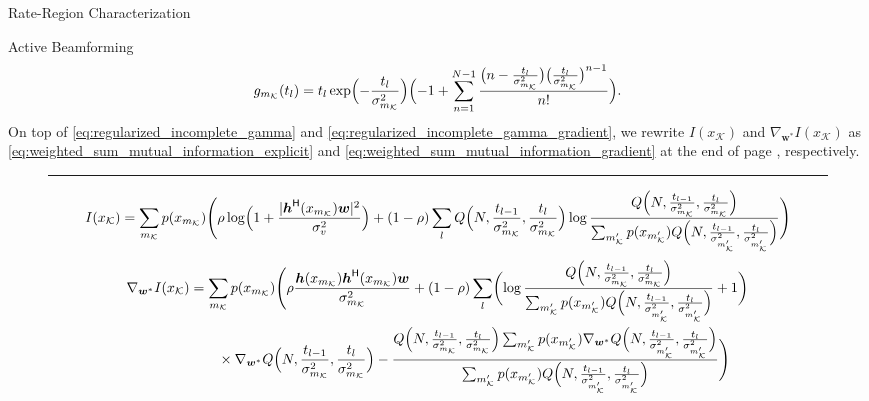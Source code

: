 \documentclass[journal]{IEEEtran}
\begin{document}
\begin{section}{Rate-Region Characterization}
\begin{subsection}{Active Beamforming}
\begin{equation}
			g_{m_{\mathcal{K}}}(t_l) = t_l\exp\Bigl(-\frac{t_l}{\sigma_{m_{\mathcal{K}}}^2}\Bigr)\Bigl(-1+\sum_{n=1}^{N-1} \frac{\bigl(n - \frac{t_l}{\sigma_{m_{\mathcal{K}}}^2}\bigr) \bigl(\frac{t_l}{\sigma_{m_{\mathcal{K}}}^2}\bigr)^{n-1}}{n!}\Bigr).
			\label{eq:regularized_incomplete_gamma_gradient_component}
		\end{equation}
		On top of \eqref{eq:regularized_incomplete_gamma} and \eqref{eq:regularized_incomplete_gamma_gradient}, we rewrite $I(x_{\mathcal{K}})$ and $\nabla_{\boldsymbol{w}^*} I(x_{\mathcal{K}})$ as \eqref{eq:weighted_sum_mutual_information_explicit} and \eqref{eq:weighted_sum_mutual_information_gradient} at the end of page \pageref{eq:weighted_sum_mutual_information_explicit}, respectively.
		\begin{figure*}[!b]
			\hrule
			\begin{equation}
				I(x_{\mathcal{K}})=\sum_{m_{\mathcal{K}}}p(x_{m_{\mathcal{K}}})\Biggl(\rho\log\Bigl(1+\frac{\lvert\boldsymbol{h}^\mathsf{H}(x_{m_{\mathcal{K}}})\boldsymbol{w}\rvert^2}{\sigma_v^2}\Bigr)+(1-\rho)\sum_l Q\Bigl(N,\frac{t_{l-1}}{\sigma_{m_{\mathcal{K}}}^2},\frac{t_l}{\sigma_{m_{\mathcal{K}}}^2}\Bigr) \log \frac{Q\Bigl(N,\frac{t_{l-1}}{\sigma_{m_{\mathcal{K}}}^2},\frac{t_l}{\sigma_{m_{\mathcal{K}}}^2}\Bigr)}{\sum_{m_{\mathcal{K}}'} p(x_{m_{\mathcal{K}}'}) Q\Bigl(N,\frac{t_{l-1}}{\sigma_{m_{\mathcal{K}}'}^2},\frac{t_l}{\sigma_{m_{\mathcal{K}}'}^2}\Bigr)}\Biggr)
				\label{eq:weighted_sum_mutual_information_explicit}
			\end{equation}
			\begin{align}
				\nabla_{\boldsymbol{w}^*} I(x_{\mathcal{K}})
				 & = \sum_{m_{\mathcal{K}}}p(x_{m_{\mathcal{K}}})\Biggl(\rho\frac{\boldsymbol{h}(x_{m_{\mathcal{K}}})\boldsymbol{h}^\mathsf{H}(x_{m_{\mathcal{K}}})\boldsymbol{w}}{\sigma_{m_{\mathcal{K}}}^2}+(1-\rho)\sum_l\biggl(\log\frac{Q\Bigl(N,\frac{t_{l-1}}{\sigma_{m_{\mathcal{K}}}^2},\frac{t_l}{\sigma_{m_{\mathcal{K}}}^2}\Bigr)}{\sum_{m_{\mathcal{K}}'}p(x_{m_{\mathcal{K}}'})Q\Bigl(N,\frac{t_{l-1}}{\sigma_{m_{\mathcal{K}}'}^2},\frac{t_l}{\sigma_{m_{\mathcal{K}}'}^2}\Bigr)}+1\biggr)\nonumber                                                                                   \\
				 & \qquad \times \nabla_{\boldsymbol{w}^*} Q\Bigl(N,\frac{t_{l-1}}{\sigma_{m_{\mathcal{K}}}^2},\frac{t_l}{\sigma_{m_{\mathcal{K}}}^2}\Bigr)-\frac{Q\Bigl(N,\frac{t_{l-1}}{\sigma_{m_{\mathcal{K}}}^2},\frac{t_l}{\sigma_{m_{\mathcal{K}}}^2}\Bigr)\sum_{m_{\mathcal{K}}'}p(x_{m_{\mathcal{K}}'})\nabla_{\boldsymbol{w}^*}Q\Bigl(N,\frac{t_{l-1}}{\sigma_{m_{\mathcal{K}}'}^2},\frac{t_l}{\sigma_{m_{\mathcal{K}}'}^2}\Bigr)}{\sum_{m_{\mathcal{K}}'}p(x_{m_{\mathcal{K}}'})Q\Bigl(N,\frac{t_{l-1}}{\sigma_{m_{\mathcal{K}}'}^2},\frac{t_l}{\sigma_{m_{\mathcal{K}}'}^2}\Bigr)}\Biggr)

\end{align}
\end{figure*}
\end{subsection}
\end{section}
\end{document}
